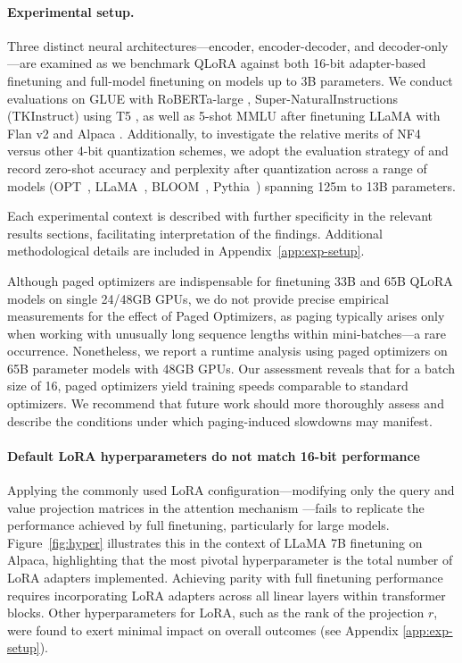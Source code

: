 \paragraph{Experimental setup.} Three distinct neural architectures—encoder, encoder-decoder, and decoder-only—are examined as we benchmark QLoRA against both 16-bit adapter-based finetuning and full-model finetuning on models up to 3B parameters. We conduct evaluations on GLUE \citep{wang2018glue} with RoBERTa-large \citep{liu2019roberta}, Super-NaturalInstructions (TKInstruct) \citep{wang2022super} using T5 \citep{t5}, as well as 5-shot MMLU \citep{hendrycksmeasuring} after finetuning LLaMA with Flan v2 \citep{longpre2023flan} and Alpaca \citep{alpaca}. Additionally, to investigate the relative merits of NF4 versus other 4-bit quantization schemes, we adopt the evaluation strategy of \citet{dettmers2022case} and record zero-shot accuracy and perplexity after quantization across a range of models (OPT~\citep{zhang2022opt}, LLaMA~\citep{touvron2023llama}, BLOOM~\citep{scao2022bloom}, Pythia~\citep{biderman2023pythia}) spanning 125m to 13B parameters.

Each experimental context is described with further specificity in the relevant results sections, facilitating interpretation of the findings. Additional methodological details are included in Appendix~\ref{app:exp-setup}.

Although paged optimizers are indispensable for finetuning 33B and 65B \textsc{QLoRA} models on single 24/48GB GPUs, we do not provide precise empirical measurements for the effect of Paged Optimizers, as paging typically arises only when working with unusually long sequence lengths within mini-batches—a rare occurrence. Nonetheless, we report a runtime analysis using paged optimizers on 65B parameter models with 48GB GPUs. Our assessment reveals that for a batch size of 16, paged optimizers yield training speeds comparable to standard optimizers. We recommend that future work should more thoroughly assess and describe the conditions under which paging-induced slowdowns may manifest.

\paragraph{Default LoRA hyperparameters do not match 16-bit performance} 

Applying the commonly used LoRA configuration—modifying only the query and value projection matrices in the attention mechanism \citep{hu2021lora}—fails to replicate the performance achieved by full finetuning, particularly for large models. Figure~\ref{fig:hyper} illustrates this in the context of LLaMA 7B finetuning on Alpaca, highlighting that the most pivotal hyperparameter is the total number of LoRA adapters implemented. Achieving parity with full finetuning performance requires incorporating LoRA adapters across all linear layers within transformer blocks. Other hyperparameters for LoRA, such as the rank of the projection $r$, were found to exert minimal impact on overall outcomes (see Appendix \ref{app:exp-setup}).

